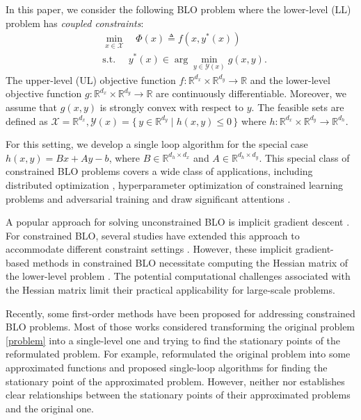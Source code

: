 \documentclass{article}
\newcommand{\Xc}{\mathcal{X}}
\newcommand{\Yc}{\mathcal{Y}}
\def\R{\mathbb{R}}
\newcommand{\st}{\text{s.t. }}
\theoremstyle{plain}
\theoremstyle{definition}
\theoremstyle{remark}
\begin{document}
In this paper, we consider the following BLO problem where the lower-level (LL) problem has \emph{coupled constraints}:
\begin{align}\label{problem}
    &\min_{x\in \Xc} \quad \Phi(x) \triangleq f(x,y^*(x))\\ \nonumber
    &\st \quad y^*(x)\in\arg\min_{y\in \Yc(x)} g(x,y).
\end{align}
The upper-level (UL) objective function $f: \mathbb{R}^{d_x} \times \mathbb{R}^{d_y} \to \mathbb{R}$ and the lower-level objective function $g: \mathbb{R}^{d_x} \times \mathbb{R}^{d_y} \to \mathbb{R}$ are continuously differentiable. Moreover, we assume that $g(x,y)$ is strongly convex with respect to $y$. The feasible sets are defined as
$\mathcal{X} = \mathbb{R}^{d_x}, \mathcal{Y}(x) = \{\, y \in \mathbb{R}^{d_y} \mid h(x,y) \le 0 \,\}$
where $h: \mathbb{R}^{d_x} \times \mathbb{R}^{d_y} \to \mathbb{R}^{d_h}$.


For this setting, we develop a single loop algorithm for the special case $h(x,y)=Bx+Ay-b$, where $B\in \R^{d_h\times d_x}$ and $A\in \R^{d_h\times d_y}$.   This special class of constrained BLO problems covers a wide class of applications, including distributed optimization \citep{yang2022decentralized}, hyperparameter optimization of constrained learning problems \citep{xu2023efficient} and adversarial training \citep{zhang2022revisiting} and draw significant attentions \citep{tsaknakis2022implicit, khanduri2023linearly, kornowski2024first}. 


A popular approach for solving unconstrained BLO is implicit gradient descent \citep{ghadimi2018approximation, ji2021bilevel,ji2022will, chen2022single, khanduri2021near}. For constrained BLO, several studies have extended this approach to accommodate different constraint settings \citep{tsaknakis2022implicit, khanduri2023linearly, xu2023efficient, xiao2023alternating}. However, these implicit gradient-based methods in constrained BLO necessitate computing the Hessian matrix of the lower-level problem \citep{tsaknakis2022implicit, khanduri2023linearly, xu2023efficient, xiao2023alternating}. The potential computational challenges
associated with the Hessian matrix limit their practical applicability for large-scale problems.



Recently, some first-order methods \citep{kwon2023penalty,yao2024constrained, yao2024overcoming, jiang2024primal, kornowski2024first} have been proposed for addressing constrained BLO problems. Most of those works considered transforming the original problem \eqref{problem} into a single-level one and trying to find the stationary points of the reformulated problem. For example, \cite{yao2024constrained, yao2024overcoming} reformulated the original problem into some approximated functions and proposed single-loop algorithms for finding the stationary point of the approximated problem. However, neither \cite{yao2024constrained} nor \cite{yao2024overcoming} establishes clear relationships between the stationary points of their approximated problems and the original one. 
\end{document}
